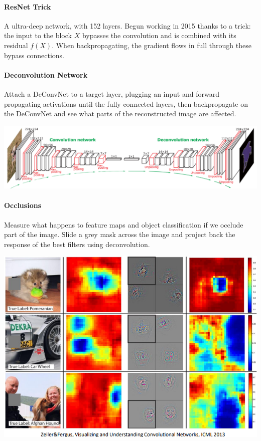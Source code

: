 \documentclass[10pt]{report}
\begin{document}
\paragraph{ResNet Trick} A ultra-deep network, with 152 layers. Begun working in 2015 thanks to a trick: the input to the block $X$ bypasses the convolution and is combined with its residual $f(X)$. When backpropagating, the gradient flows in full through these bypass connections.
\paragraph{Deconvolution Network} Attach a DeConvNet to a target layer, plugging an input and forward propagating activations until the fully connected layers, then backpropagate on the DeConvNet and see what parts of the reconstructed image are affected.
\begin{center}
	\includegraphics[scale=0.5]{68.png}
\end{center}
\paragraph{Occlusions} Measure what happens to feature maps and object classification if we occlude part of the image. Slide a grey mask across the image and project back the response of the best filters using deconvolution.\begin{center}
	\includegraphics[scale=0.33]{83.png}
\end{center}
\end{document}
